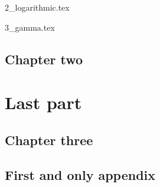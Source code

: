 \documentclass{book}
\begin{document}
{2_logarithmic.tex}

{3_gamma.tex}

\chapter{Chapter two}


\part{Last part}
\chapter{Chapter three}

\appendix
\chapter{First and only appendix}

\backmatter
\end{document}
